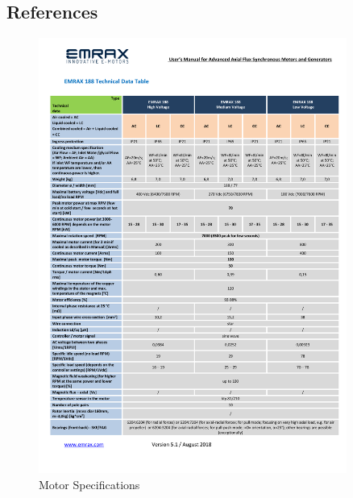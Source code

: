 \subsection{References}

\begin{figure}[H]
\centering
\includegraphics[width=0.9\textwidth]{texfiles/mech/eimg/propulsion/table_motor}
\caption{Motor Specifications}
\label{tab: Motor Specifications}
\end{figure}
